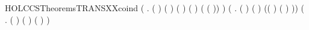 \begin{SaveVerbatim}{HOLCCSTheoremsTRANSXXcoind}
            (\HOLSymConst{\HOLTokenExists{}}    .
                 ( \HOLSymConst{=}  \HOLSymConst{\ensuremath{\parallel}} ) \HOLSymConst{\HOLTokenConj{}} ( \HOLSymConst{=} \HOLConst{\ensuremath{\tau}}) \HOLSymConst{\HOLTokenConj{}} ( \HOLSymConst{=}  \HOLSymConst{\ensuremath{\parallel}} ) \HOLSymConst{\HOLTokenConj{}}
                   ( )  \HOLSymConst{\HOLTokenConj{}}
                   ( ( )) ) \HOLSymConst{\HOLTokenDisj{}}
            (\HOLSymConst{\HOLTokenExists{}}   .
                 ( \HOLSymConst{=} \HOLConst{\ensuremath{\nu}}  ) \HOLSymConst{\HOLTokenConj{}} ( \HOLSymConst{=} \HOLConst{\ensuremath{\nu}}  ) \HOLSymConst{\HOLTokenConj{}}     \HOLSymConst{\HOLTokenConj{}}
                 (( \HOLSymConst{=} \HOLConst{\ensuremath{\tau}}) \HOLSymConst{\HOLTokenDisj{}}
                  ( \HOLSymConst{=}  ) \HOLSymConst{\HOLTokenConj{}}  \HOLConst{\HOLTokenNotIn{}}  \HOLSymConst{\HOLTokenConj{}}   \HOLConst{\HOLTokenNotIn{}} )) \HOLSymConst{\HOLTokenDisj{}}
            (\HOLSymConst{\HOLTokenExists{}}   .
                 ( \HOLSymConst{=}   ) \HOLSymConst{\HOLTokenConj{}} ( \HOLSymConst{=}   ) \HOLSymConst{\HOLTokenConj{}}
                 ( \HOLSymConst{=}   ) \HOLSymConst{\HOLTokenConj{}}    ) \HOLSymConst{\HOLTokenDisj{}}

\end{SaveVerbatim}
